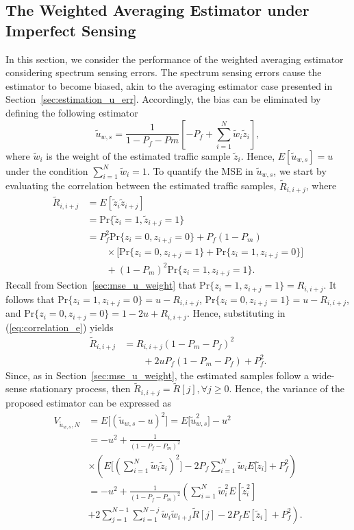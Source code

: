 \documentclass[11pt,draftclsnofoot,journal,onecolumn]{IEEEtran}
\begin{document}
\subsection{The Weighted Averaging Estimator under Imperfect Sensing}

In this section, we consider the performance of the weighted averaging estimator considering spectrum sensing errors. The spectrum sensing errors cause the estimator to become biased, akin to the averaging estimator case presented in Section~\ref{sec:estimation_u_err}. Accordingly, the bias can be eliminated by defining the following estimator
\begin{equation}
\tilde u_{w,s}=\frac{1}{1-P_f-Pm}\left[-P_f+\sum_{i=1}^{N}\tilde w_i\tilde z_i\right],
\label{eq:uwe}
\end{equation}
where $\tilde w_i$ is the weight of the estimated traffic sample $\tilde z_i$. Hence, $E[\tilde u_{w,s}]=u$ under the condition $\sum_{i=1}^{N}\tilde w_i=1$. To quantify the MSE in $\tilde u_{w,s}$, we start by evaluating the correlation between the estimated traffic samples, $\tilde R_{i,i+j}$, where
\begin{align}
\tilde R_{i,i+j} & = E[\tilde z_i\tilde z_{i+j}]\nonumber\\ & = \text{Pr}\{\tilde z_i=1, \tilde z_{i+j}=1\}\nonumber\\
& = P_f^2\text{Pr}\{z_i=0, z_{i+j}=0\} + P_f(1-P_m)\nonumber\\&\qquad\times\Big[\text{Pr}\{z_i=0, z_{i+j}=1\} + \text{Pr}\{z_i=1, z_{i+j}=0\}\Big]\nonumber\\& \qquad + (1-P_m)^2\text{Pr}\{z_i=1, z_{i+j}=1\}.
\label{eq:correlation_e}
\end{align}
Recall from Section~\ref{sec:mse_u_weight} that $\text{Pr}\{z_i=1, z_{i+j}=1\} = R_{i,i+j}$. It follows that $\text{Pr}\{z_i=1, z_{i+j}=0\}=u-R_{i,i+j}$, $\text{Pr}\{z_i=0, z_{i+j}=1\}=u-R_{i,i+j}$, and $\text{Pr}\{z_i=0, z_{i+j}=0\} = 1 - 2u + R_{i,i+j}$. Hence, substituting in (\ref{eq:correlation_e}) yields
\begin{align}
\tilde R_{i,i+j} & = R_{i,i+j}(1-P_m-P_f)^2\nonumber\\&\qquad + 2uP_f(1-P_m-P_f)+P_f^2.
\label{eq:correlation:ee}
\end{align}
Since, as in Section~\ref{sec:mse_u_weight}, the estimated samples follow a wide-sense stationary process, then $\tilde R_{i,i+j} = \tilde R[j], \forall j\geq0$. Hence, the variance of the proposed estimator can be expressed as
\begin{align}
V_{\tilde u_{w,s},N} & = E\Big[(\tilde u_{w,s}-u)^2\Big] = E\Big[\tilde u_{w,s}^2\Big]-u^2 \nonumber\\
& = -u^2+\frac{1}{(1-P_f-P_m)^2}\nonumber\\&\times\left(E\Bigg[\left(\sum_{i=1}^N\tilde w_i\tilde z_i\right)^2\Bigg] - 2P_f\sum_{i=1}^N\tilde w_i E\Big[\tilde z_i\Big]+P_f^2\right) \nonumber\\
&=-u^2+\frac{1}{(1-P_f-P_m)^2}\left(\sum_{i=1}^N \tilde w_i^2 E[\tilde z_i^2]\right.\nonumber\\&\left. +2\sum_{j=1}^{N-1}\sum_{i=1}^{N-j}\tilde w_i\tilde w_{i+j} \tilde{R}[j]-2P_f E[\tilde z_i] + P_f^2\right).
\label{eq:V_wee}
\end{align}
\end{document}
